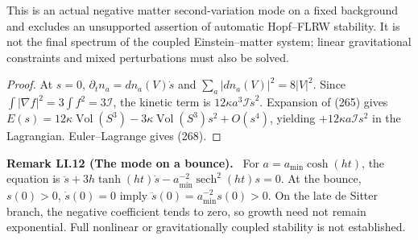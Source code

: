 \documentclass[11pt,a4paper,oneside]{book}
\newcommand{\statement}[3]{\par\medskip\noindent\textbf{#1 #2 (#3).}\ }
\begin{document}
This is an actual negative matter second-variation mode on a fixed background and excludes an unsupported assertion of automatic Hopf--FLRW stability. It is not the final spectrum of the coupled Einstein--matter system; linear gravitational constraints and mixed perturbations must also be solved.
\begin{proof}
At $s=0$, $\partial_tn_a=dn_a(V)\dot s$ and $\sum_a|dn_a(V)|^2=8|V|^2$. Since $\int|\nabla f|^2=3\int f^2=3\mathcal I$, the kinetic term is $12\kappa a^3\mathcal I\dot s^2$. Expansion of (265) gives $E(s)=12\kappa\operatorname{Vol}(S^3)-3\kappa\operatorname{Vol}(S^3)s^2+O(s^4)$, yielding $+12\kappa a\mathcal I s^2$ in the Lagrangian. Euler--Lagrange gives (268).
\end{proof}
\statement{Remark}{LI.12}{The mode on a bounce}
For $a=a_{\min}\cosh(ht)$, the equation is $\ddot s+3h\tanh(ht)\dot s-a_{\min}^{-2}\operatorname{sech}^2(ht)s=0$. At the bounce, $s(0)>0$, $\dot s(0)=0$ imply $\ddot s(0)=a_{\min}^{-2}s(0)>0$. On the late de Sitter branch, the negative coefficient tends to zero, so growth need not remain exponential. Full nonlinear or gravitationally coupled stability is not established.
\end{document}
